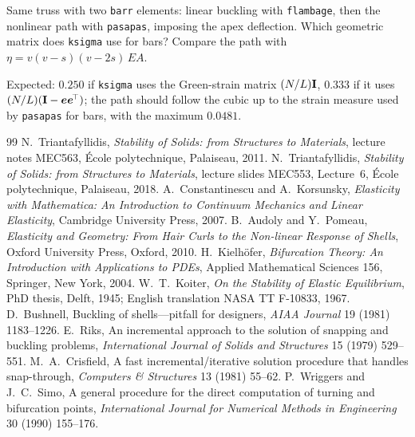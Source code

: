\label{exo:nc-computer-castem}
%
Same truss with two \texttt{barr} elements: linear buckling with \texttt{flambage}, then the
nonlinear path with \texttt{pasapas}, imposing the apex deflection. Which geometric matrix does
\texttt{ksigma} use for bars? Compare the path with $\eta = v(v - s)(v - 2s)\,EA$.
\begin{solution}
Expected: $0.250$ if \texttt{ksigma} uses the Green-strain matrix $(N/L)\mathbf{I}$, $0.333$ if it
uses $(N/L)(\mathbf{I} - \bm{e}\bm{e}^{\!\top})$; the path should follow the cubic up to the strain
measure used by \texttt{pasapas} for bars, with the maximum $0.0481$.

\end{solution}

\begin{chapterbib}{99}
 N.~Triantafyllidis, \emph{Stability of Solids: from Structures to Materials}, lecture notes MEC563, \'Ecole polytechnique, Palaiseau, 2011.
 N.~Triantafyllidis, \emph{Stability of Solids: from Structures to Materials}, lecture slides MEC553, Lecture~6, \'Ecole polytechnique, Palaiseau, 2018.
 A.~Constantinescu and A.~Korsunsky, \emph{Elasticity with Mathematica: An Introduction to Continuum Mechanics and Linear Elasticity}, Cambridge University Press, 2007.
 B.~Audoly and Y.~Pomeau, \emph{Elasticity and Geometry: From Hair Curls to the Non-linear Response of Shells}, Oxford University Press, Oxford, 2010.
 H.~Kielh\"ofer, \emph{Bifurcation Theory: An Introduction with Applications to PDEs}, Applied Mathematical Sciences 156, Springer, New York, 2004.
 W.~T.~Koiter, \emph{On the Stability of Elastic Equilibrium}, PhD thesis, Delft, 1945; English translation NASA TT F-10833, 1967.
 D.~Bushnell, Buckling of shells---pitfall for designers, \emph{AIAA Journal} 19 (1981) 1183--1226.
 E.~Riks, An incremental approach to the solution of snapping and buckling problems, \emph{International Journal of Solids and Structures} 15 (1979) 529--551.
 M.~A.~Crisfield, A fast incremental/iterative solution procedure that handles snap-through, \emph{Computers \& Structures} 13 (1981) 55--62.
 P.~Wriggers and J.~C.~Simo, A general procedure for the direct computation of turning and bifurcation points, \emph{International Journal for Numerical Methods in Engineering} 30 (1990) 155--176.

\end{chapterbib}

